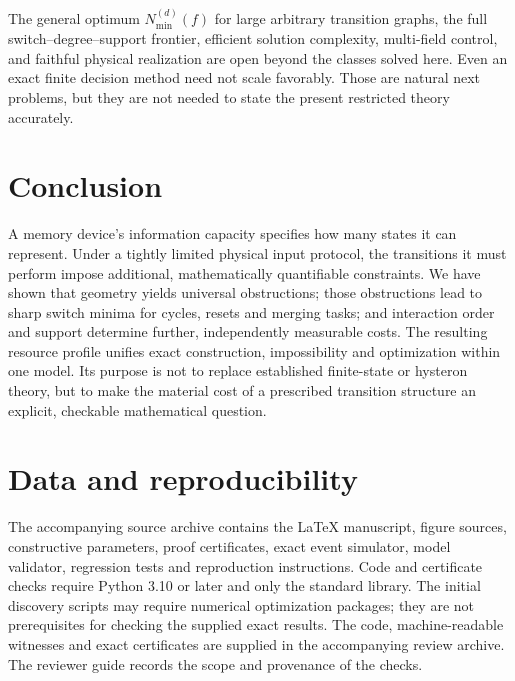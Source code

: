 \documentclass[12pt,letterpaper]{article}
\theoremstyle{definition}\newtheorem{definition}[theorem]{Definition}
\theoremstyle{remark}\newtheorem{remark}[theorem]{Remark}
\newcommand{\Nmin}{N_{\min}}
\begin{document}
The general optimum $\Nmin^{(d)}(f)$ for large arbitrary transition graphs, the full switch--degree--support frontier, efficient solution complexity, multi-field control, and faithful physical realization are open beyond the classes solved here. Even an exact finite decision method need not scale favorably. Those are natural next problems, but they are not needed to state the present restricted theory accurately.

\section{Conclusion}
A memory device's information capacity specifies how many states it can represent. Under a tightly limited physical input protocol, the transitions it must perform impose additional, mathematically quantifiable constraints. We have shown that geometry yields universal obstructions; those obstructions lead to sharp switch minima for cycles, resets and merging tasks; and interaction order and support determine further, independently measurable costs. The resulting resource profile unifies exact construction, impossibility and optimization within one model. Its purpose is not to replace established finite-state or hysteron theory, but to make the material cost of a prescribed transition structure an explicit, checkable mathematical question.

\section*{Data and reproducibility}
The accompanying source archive contains the LaTeX manuscript, figure sources, constructive parameters, proof certificates, exact event simulator, model validator, regression tests and reproduction instructions. Code and certificate checks require Python 3.10 or later and only the standard library. The initial discovery scripts may require numerical optimization packages; they are not prerequisites for checking the supplied exact results. The code, machine-readable witnesses and exact certificates are supplied in the accompanying review archive. The reviewer guide records the scope and provenance of the checks.

\appendix
\end{document}
